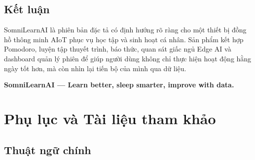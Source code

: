 \documentclass[12pt,a4paper]{article}
\begin{document}
\subsection{Kết luận}

SomniLearnAI là phiên bản đặc tả có định hướng rõ ràng cho một thiết bị đồng hồ thông minh AIoT phục vụ học tập và sinh hoạt cá nhân. Sản phẩm kết hợp Pomodoro, luyện tập thuyết trình, báo thức, quan sát giấc ngủ Edge AI và dashboard quản lý phiên để giúp người dùng không chỉ thực hiện hoạt động hằng ngày tốt hơn, mà còn nhìn lại tiến bộ của mình qua dữ liệu.

\begin{center}
\textbf{SomniLearnAI --- Learn better, sleep smarter, improve with data.}
\end{center}

\newpage
\section{Phụ lục và Tài liệu tham khảo}

\subsection{Thuật ngữ chính}
\end{document}

